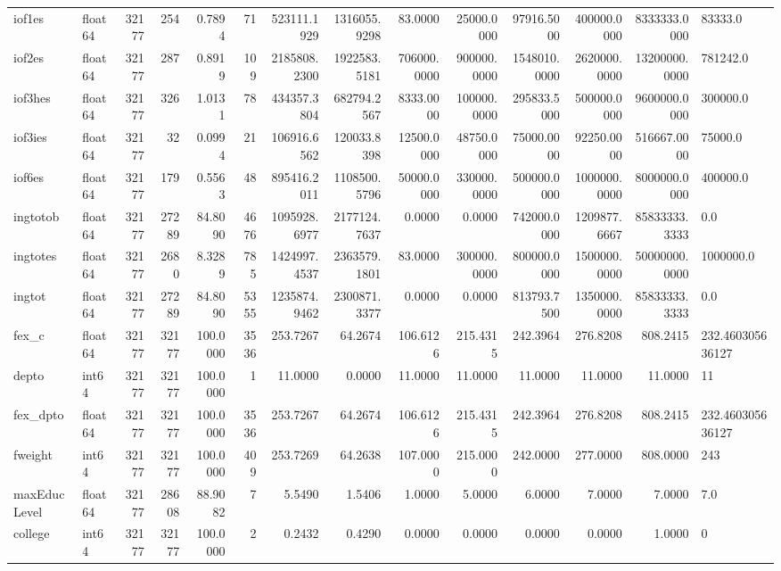 \begin{longtable}{llrrrrrrrrrrrl}
iof1es & float64 & 32177 & 254 & 0.7894 & 71 & 523111.1929 & 1316055.9298 & 83.0000 & 25000.0000 & 97916.5000 & 400000.0000 & 8333333.0000 & 83333.0 \\
iof2es & float64 & 32177 & 287 & 0.8919 & 109 & 2185808.2300 & 1922583.5181 & 706000.0000 & 900000.0000 & 1548010.0000 & 2620000.0000 & 13200000.0000 & 781242.0 \\
iof3hes & float64 & 32177 & 326 & 1.0131 & 78 & 434357.3804 & 682794.2567 & 8333.0000 & 100000.0000 & 295833.5000 & 500000.0000 & 9600000.0000 & 300000.0 \\
iof3ies & float64 & 32177 & 32 & 0.0994 & 21 & 106916.6562 & 120033.8398 & 12500.0000 & 48750.0000 & 75000.0000 & 92250.0000 & 516667.0000 & 75000.0 \\
iof6es & float64 & 32177 & 179 & 0.5563 & 48 & 895416.2011 & 1108500.5796 & 50000.0000 & 330000.0000 & 500000.0000 & 1000000.0000 & 8000000.0000 & 400000.0 \\
ingtotob & float64 & 32177 & 27289 & 84.8090 & 4676 & 1095928.6977 & 2177124.7637 & 0.0000 & 0.0000 & 742000.0000 & 1209877.6667 & 85833333.3333 & 0.0 \\
ingtotes & float64 & 32177 & 2680 & 8.3289 & 785 & 1424997.4537 & 2363579.1801 & 83.0000 & 300000.0000 & 800000.0000 & 1500000.0000 & 50000000.0000 & 1000000.0 \\
ingtot & float64 & 32177 & 27289 & 84.8090 & 5355 & 1235874.9462 & 2300871.3377 & 0.0000 & 0.0000 & 813793.7500 & 1350000.0000 & 85833333.3333 & 0.0 \\
fex\_c & float64 & 32177 & 32177 & 100.0000 & 3536 & 253.7267 & 64.2674 & 106.6126 & 215.4315 & 242.3964 & 276.8208 & 808.2415 & 232.460305636127 \\
depto & int64 & 32177 & 32177 & 100.0000 & 1 & 11.0000 & 0.0000 & 11.0000 & 11.0000 & 11.0000 & 11.0000 & 11.0000 & 11 \\
fex\_dpto & float64 & 32177 & 32177 & 100.0000 & 3536 & 253.7267 & 64.2674 & 106.6126 & 215.4315 & 242.3964 & 276.8208 & 808.2415 & 232.460305636127 \\
fweight & int64 & 32177 & 32177 & 100.0000 & 409 & 253.7269 & 64.2638 & 107.0000 & 215.0000 & 242.0000 & 277.0000 & 808.0000 & 243 \\
maxEducLevel & float64 & 32177 & 28608 & 88.9082 & 7 & 5.5490 & 1.5406 & 1.0000 & 5.0000 & 6.0000 & 7.0000 & 7.0000 & 7.0 \\
college & int64 & 32177 & 32177 & 100.0000 & 2 & 0.2432 & 0.4290 & 0.0000 & 0.0000 & 0.0000 & 0.0000 & 1.0000 & 0 \\

\end{longtable}
